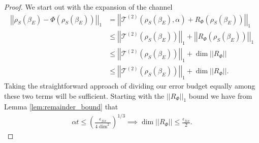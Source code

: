 \documentclass{article}
\newcommand{\parens}[1]{\left( #1 \right)}
\newcommand{\norm}[1]{\left| \left| #1 \right| \right|}
\begin{document}
\begin{proof}
    We start out with the expansion of the channel
    \begin{align}
        \norm{\rho_S(\beta_E) - \Phi(\rho_S(\beta_E))}_1 &= \norm{\mathcal{T}^{(2)}(\rho_S(\beta_E), \alpha) + R_{\Phi}(\rho_S(\beta_E))}_1 \\
        &\leq \norm{\mathcal{T}^{(2)}(\rho_S(\beta_E))}_1 + \norm{R_{\Phi}(\rho_S(\beta_E))}_1 \\
        &\leq \norm{\mathcal{T}^{(2)}(\rho_S(\beta_E))}_1 + \dim \norm{R_{\Phi}} \\
        &\leq \norm{\mathcal{T}^{(2)}(\rho_S(\beta_E))}_1 + \dim \norm{R_{\Phi}}.
    \end{align}
    Taking the straightforward approach of dividing our error budget equally among these two terms will be sufficient. Starting with the $\norm{R_{\Phi}}_1$ bound we have from Lemma \ref{lem:remainder_bound} that
    \begin{align}
        \alpha t \leq \parens{\frac{\epsilon_{fix}}{4 \dim^2}}^{1/3} \implies \dim \norm{R_{\Phi}} \leq \frac{\epsilon_{fix}}{2}. \label{tmp:first_alpha_t_req_fixed_pt}
    \end{align}


\end{proof}
\end{document}
